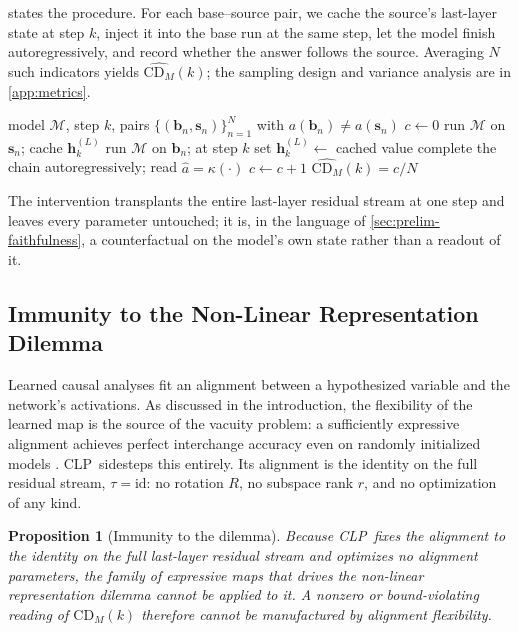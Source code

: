 \documentclass[11pt]{article}
\newtheorem{proposition}{Proposition}
\newcommand{\CDM}{\mathrm{CD}_{M}}
\newcommand{\stepk}{k}
\newcommand{\CLP}{\textsc{CLP}}
\begin{document}
 states the procedure. For each base--source pair, we cache the
source's last-layer state at step $\stepk$, inject it into the base run at the
same step, let the model finish autoregressively, and record whether the answer
follows the source. Averaging $N$ such indicators yields $\widehat{\CDM}
(\stepk)$; the sampling design and variance analysis are in
\cref{app:metrics}.

\begin{algorithm}[t]
\caption{Causal Lookahead Probing at step $\stepk$}
\label{alg:clp}
\begin{algorithmic}[1]
\Require model $\mathcal{M}$, step $\stepk$, pairs $\{(\mathbf{b}_n,\mathbf{s}_n)\}_{n=1}^{N}$ with $a(\mathbf{b}_n)\neq a(\mathbf{s}_n)$
\State $c \gets 0$
  \State run $\mathcal{M}$ on $\mathbf{s}_n$; cache $\mathbf{h}^{(L)}_{\stepk}$
  \State run $\mathcal{M}$ on $\mathbf{b}_n$; at step $\stepk$ set $\mathbf{h}^{(L)}_{\stepk}\!\gets$ cached value
  \State complete the chain autoregressively; read $\hat{a}=\kappa(\cdot)$
   $c \gets c + 1$ \EndIf
\EndFor
\State \Return $\widehat{\CDM}(\stepk) = c / N$
\end{algorithmic}
\end{algorithm}

The intervention transplants the entire last-layer residual stream at one step
and leaves every parameter untouched; it is, in the language of
\cref{sec:prelim-faithfulness}, a counterfactual on the model's own state rather
than a readout of it.

\subsection{Immunity to the Non-Linear Representation Dilemma}
\label{sec:clp-immunity}

Learned causal analyses fit an alignment between a hypothesized variable and the
network's activations. As discussed in the introduction, the flexibility of the
learned map is the source of the vacuity problem: a sufficiently expressive
alignment achieves perfect interchange accuracy even on randomly initialized
models \citep{sutter2025nonlinear}. \CLP\ sidesteps this entirely. Its alignment
is the identity on the full residual stream, $\tau = \mathrm{id}$: no rotation
$R$, no subspace rank $r$, and no optimization of any kind.

\begin{proposition}[Immunity to the dilemma]
\label{prop:immunity}
Because \CLP\ fixes the alignment to the identity on the full last-layer
residual stream and optimizes no alignment parameters, the family of expressive
maps that drives the non-linear representation dilemma cannot be applied to it.
A nonzero or bound-violating reading of $\CDM(\stepk)$ therefore cannot be
manufactured by alignment flexibility.
\end{proposition}
\end{document}
